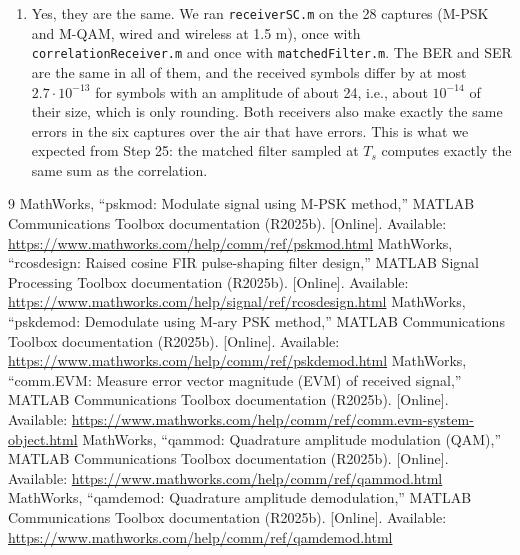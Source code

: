 \documentclass[11pt]{article}
\begin{document}
\begin{enumerate}[resume]
    \item Yes, they are the same. We ran \texttt{receiverSC.m} on the 28 captures (M-PSK and M-QAM, wired and wireless at 1.5 m), once with \texttt{correlationReceiver.m} and once with \texttt{matchedFilter.m}. The BER and SER are the same in all of them, and the received symbols differ by at most $2.7 \cdot 10^{-13}$ for symbols with an amplitude of about 24, i.e., about $10^{-14}$ of their size, which is only rounding. Both receivers also make exactly the same errors in the six captures over the air that have errors. This is what we expected from Step 25: the matched filter sampled at $T_s$ computes exactly the same sum as the correlation.
\end{enumerate}

\begin{thebibliography}{9}
     MathWorks, ``pskmod: Modulate signal using M-PSK method,'' MATLAB Communications Toolbox documentation (R2025b). [Online]. Available: \url{https://www.mathworks.com/help/comm/ref/pskmod.html}
     MathWorks, ``rcosdesign: Raised cosine FIR pulse-shaping filter design,'' MATLAB Signal Processing Toolbox documentation (R2025b). [Online]. Available: \url{https://www.mathworks.com/help/signal/ref/rcosdesign.html}
     MathWorks, ``pskdemod: Demodulate using M-ary PSK method,'' MATLAB Communications Toolbox documentation (R2025b). [Online]. Available: \url{https://www.mathworks.com/help/comm/ref/pskdemod.html}
     MathWorks, ``comm.EVM: Measure error vector magnitude (EVM) of received signal,'' MATLAB Communications Toolbox documentation (R2025b). [Online]. Available: \url{https://www.mathworks.com/help/comm/ref/comm.evm-system-object.html}
     MathWorks, ``qammod: Quadrature amplitude modulation (QAM),'' MATLAB Communications Toolbox documentation (R2025b). [Online]. Available: \url{https://www.mathworks.com/help/comm/ref/qammod.html}
     MathWorks, ``qamdemod: Quadrature amplitude demodulation,'' MATLAB Communications Toolbox documentation (R2025b). [Online]. Available: \url{https://www.mathworks.com/help/comm/ref/qamdemod.html}
\end{thebibliography}
\end{document}
